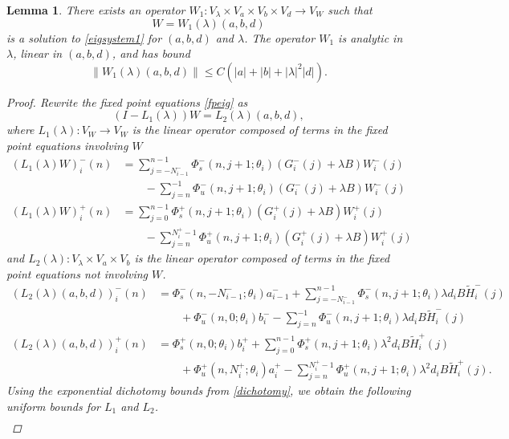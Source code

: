 \documentclass[12pt]{elsarticle}
\newtheorem{lemma}{Lemma}
\begin{document}
\begin{lemma}\label{eiginv1}
There exists an operator $W_1: V_\lambda \times V_a \times V_b \times V_d \rightarrow V_W$ such that
\[
W = W_1(\lambda)(a,b,d)
\]
is a solution to \cref{eigsystem1} for $(a,b,d)$ and $\lambda$. The operator $W_1$ is analytic in $\lambda$, linear in $(a,b,d)$, and has bound
\begin{equation}\label{W1bound}
\|W_1(\lambda)(a,b,d)\| \leq C \left( |a| + |b| + |\lambda|^2 |d| \right).
\end{equation}

\begin{proof}
Rewrite the fixed point equations \cref{fpeig} as
\[
(I - L_1(\lambda))W = L_2(\lambda)(a,b,d),
\]
where $L_1(\lambda): V_W \rightarrow V_W$ is the linear operator composed of terms in the fixed point equations involving $W$
\begin{align*}
(L_1(\lambda)W)_i^-(n) &= \sum_{j = -N_{i-1}^-}^{n-1} \Phi_s^-(n, j+1; \theta_i)
(G_i^-(j) + \lambda B) W_i^-(j) \\
&\qquad- \sum_{j = n}^{-1} \Phi_u^-(n, j+1; \theta_i) 
(G_i^-(j) + \lambda B) W_i^-(j)\\
(L_1(\lambda)W)_i^+(n) &= \sum_{j = 0}^{n-1} \Phi_s^+(n, j+1; \theta_i) 
(G_i^+(j) + \lambda B) W_i^+(j) \\
&\qquad-\sum_{j = n}^{N_i^+-1} \Phi_u^+(n, j+1; \theta_i) 
(G_i^+(j) + \lambda B) W_i^+(j)
\end{align*}
and $L_2(\lambda): V_\lambda \times V_a \times V_b $ is the linear operator composed of terms in the fixed point equations not involving $W$.
\begin{align*}
(L_2(\lambda)(a,b,d))_i^-(n) &= 
\Phi_s^-(n, -N_{i-1}^-; \theta_i) a_{i-1}^- + \sum_{j = -N_{i-1}^-}^{n-1} \Phi_s^-(n, j+1; \theta_i)
\lambda d_i B \tilde{H}_i^-(j)
 \\
&\qquad+ \Phi_u^-(n, 0; \theta_i) b_i^- - \sum_{j = n}^{-1} \Phi_u^-(n, j+1; \theta_i) 
\lambda d_i B \tilde{H}_i^-(j) \\
(L_2(\lambda)(a,b,d))_i^+(n) &= \Phi_s^+(n, 0; \theta_i) b_i^+ + \sum_{j = 0}^{n-1} \Phi_s^+(n, j+1; \theta_i)\lambda^2 d_i B \tilde{H}_i^+(j) \\
&\qquad+ \Phi_u^+(n, N_i^+; \theta_i) a_i^+ - \sum_{j = n}^{N_i^+-1} \Phi_u^+(n, j+1; \theta_i)\lambda^2 d_i B \tilde{H}_i^+(j).
\end{align*}
Using the exponential dichotomy bounds from \cref{dichotomy}, we obtain the following uniform bounds for $L_1$ and $L_2$.
\begin{align*}

\end{align*}
\end{proof}
\end{lemma}
\end{document}
